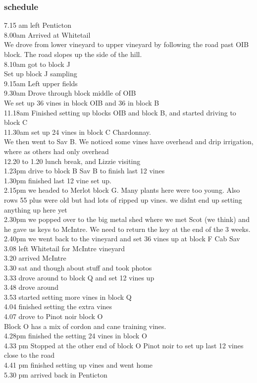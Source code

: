 \documentclass[11pt,letter]{article}
\newenvironment{smitemize}{
\begin{itemize}
  \setlength{\itemsep}{0pt}
  \setlength{\parskip}{0.8pt}
  \setlength{\parsep}{0pt}}
{\end{itemize}
}
\begin{document}
\begin{smitemize}
\subsubsection {schedule}
7.15 am left Penticton \\
8.00am Arrived at Whitetail \\
We drove from lower vineyard to upper vineyard by following the road past OIB block. The road slopes up the side of the hill. \\
8.10am got to block J \\
Set up block J sampling \\
9.15am Left upper fields \\
9.30am Drove through block middle of OIB \\
We set up 36 vines in block OIB and 36 in block B \\
11.18am Finished setting up blocks OIB and block B, and started driving to block C \\ 
11.30am set up 24 vines in block C Chardonnay. \\
We then went to Sav B. We noticed some vines have overhead and drip irrigation, where as others had only overhead \\
12.20 to 1.20 lunch break, and Lizzie visiting \\
1.23pm  drive to block B Sav B to finish last 12 vines \\
1.30pm finished last 12 vine set up. \\
2.15pm we headed to Merlot block G. Many plants here were too young. Also rows 55 plus were old but had lots of ripped up vines. we didnt end up setting anything up here yet \\
2.30pm we popped over to the big metal shed where we met Scot (we think) and he gave us keys to McIntre. We need to return the key at the end of the 3 weeks. 
2.40pm we went back to the vineyard and set 36 vines up at block F Cab Sav \\
3.08 left Whitetail for McIntre vineyard \\
3.20 arrived McIntre \\
3.30 sat and though about stuff and took photos \\
3.33 drove around to block Q and set 12 vines up\\
3.48 drove around \\
3.53 started setting more vines in block Q \\ 
4.04 finished setting the extra vines \\
4.07 drove to Pinot noir block O \\
Block O has a mix of cordon and cane training vines. \\
4.28pm finished the setting 24 vines in block O\\
4.33 pm Stopped at the other end of block O Pinot noir to set up last 12 vines close to the road\\
4.41 pm finished setting up vines and went home \\
5.30 pm arrived back in Penticton \\

\end{smitemize}
\end{document}
